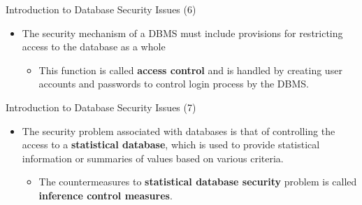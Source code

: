 \begin{frame}{Introduction to Database Security Issues (6)}
    \Large
    
    \begin{itemize}
        \vspace{-1.5cm}
        
        \item The security mechanism of a DBMS must include provisions for restricting access to the database as a whole
        
        \vspace{0.4cm}
        
        \begin{itemize}
            \large
            \setlength{\itemsep}{0.2cm} 
            
            \item This function is called \textbf{access control} and is handled by creating user accounts and passwords to control login process by the DBMS.
        \end{itemize}
        
    \end{itemize}
\end{frame}


\begin{frame}{Introduction to Database Security Issues (7)}
    \Large 
    
    \begin{itemize}
        \vspace{-1.5cm} 
        
        \item The security problem associated with databases is that of controlling the access to a \textbf{statistical database}, which is used to provide statistical information or summaries of values based on various criteria.
        
        \vspace{0.5cm} 
        
        
        \begin{itemize}
            \large 
            \setlength{\itemsep}{0.2cm}
            
            \item The countermeasures to \textbf{statistical database security} problem is called \textbf{inference control measures}.
        \end{itemize}
        
    \end{itemize}
\end{frame}

